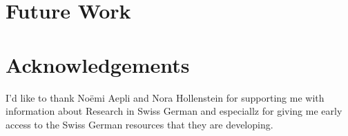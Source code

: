 \documentclass[11pt,letterpaper]{article}
\begin{document}
\section{Future Work}


\section{Acknowledgements}
I'd like to thank Noëmi Aepli and Nora Hollenstein for supporting me with information about Research in Swiss German and especiallz for giving me early access to the Swiss German resources that they are developing. 



\label{lastpage}
\end{document}
